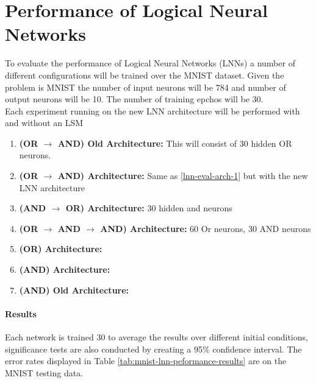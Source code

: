 \section{Performance of Logical Neural Networks} \label{sec:lnn-eval-peformance}
To evaluate the performance of Logical Neural Networks (LNNs) a number of different configurations will be trained over the MNIST dataset. Given the problem is MNIST the number of input neurons will be 784 and number of output neurons will be 10. The number of training epchos will be 30.\\

Each experiment running on the new LNN architecture will be performed with and without an LSM

\begin{enumerate}
	\item \textbf{(OR $\rightarrow$ AND) Old Architecture:} This will consist of 30 hidden OR neurons. \label{lnn-eval-arch-1}
	\item \textbf{(OR $\rightarrow$ AND) Architecture:} Same as \ref{lnn-eval-arch-1} but with the new LNN architecture \label{lnn-eval-arch-2}
	\item \textbf{(AND $\rightarrow$ OR) Architecture:} 30 hidden and neurons \label{lnn-eval-arch-3}
	\item \textbf{(OR $\rightarrow$ AND $\rightarrow$ AND) Architecture: } 60 Or neurons, 30 AND neurons\label{lnn-eval-arch-4}
	\item \textbf{(OR) Architecture:} \label{lnn-eval-arch-5}
	\item \textbf{(AND) Architecture:} \label{lnn-eval-arch-6}
	\item \textbf{(AND) Old Architecture:} \label{lnn-eval-arch-7}
\end{enumerate}

\paragraph{Results}
Each network is trained 30 to average the results over different initial conditions, significance tests are also conducted by creating a 95\% confidence interval. The error rates displayed in Table \ref{tab:mnist-lnn-peformance-results} are on the MNIST testing data.

